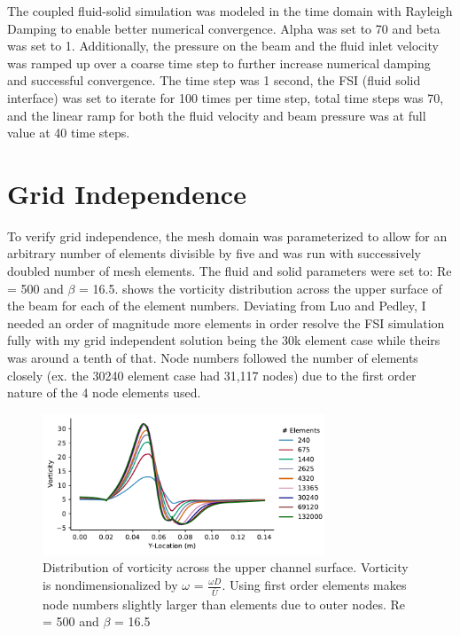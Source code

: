 \documentclass[10pt,english]{article}
\begin{document}
The coupled fluid-solid simulation was modeled in the time domain with Rayleigh Damping to enable better numerical convergence.  Alpha was set to 70 and beta was set to 1.  Additionally, the pressure on the beam and the fluid inlet velocity was ramped up over a coarse time step to further increase numerical damping and successful convergence.  The time step was 1 second, the FSI (fluid solid interface) was set to iterate for 100 times per time step, total time steps was 70, and the linear ramp for both the fluid velocity and beam pressure was at full value at 40 time steps.   


\vspace{5pt}
\section{Grid Independence}

To verify grid independence, the mesh domain was parameterized to allow for an arbitrary number of elements divisible by five and was run with successively doubled number of mesh elements.  The fluid and solid parameters were set to: Re = 500 and $\beta$ = 16.5.    shows the vorticity distribution across the upper surface of the beam for each of the element numbers.  Deviating from Luo and Pedley, I needed an order of magnitude more elements in order resolve the FSI simulation fully with my grid independent solution being the 30k element case while theirs was around a tenth of that.  Node numbers followed the number of elements closely (ex. the 30240 element case had 31,117 nodes) due to the first order nature of the 4 node elements used.

\begin{figure}[htbp]
\centering
\includegraphics[trim={.0cm .25cm .0cm 0cm},clip,width=0.75\textwidth]{fig3b}
\vspace{-5pt}
\caption{Distribution of vorticity across the upper channel surface.  Vorticity is nondimensionalized by $\omega$ = $\frac{\omega D}{\bar{U}}$.  Using first order elements makes node numbers slightly larger than elements due to outer nodes. Re = 500 and $\beta$ = 16.5}
\label{f:3b}
\end{figure}
\end{document}
